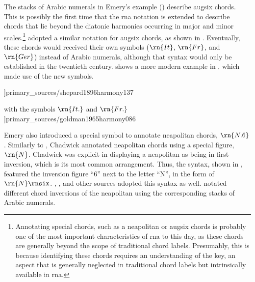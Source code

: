 


The stacks of Arabic numerals in Emery's example
() describe
\gls{augsix} chords. This is possibly the first time that
the \gls{rna} notation is extended to describe chords that
lie beyond the diatonic harmonies occurring in major and
minor scales.\footnote{Annotating special chords, such as a
\gls{neapolitan} or \gls{augsix} chords is probably one of
the most important characteristics of \gls{rna} to this day,
as these chords are generally beyond the scope of
traditional chord labels. Presumably, this is because
identifying these chords requires an understanding of the
key, an aspect that is generally neglected in traditional
chord labels but intrinsically available in \gls{rna}.}
\textcite{shepard1896harmony} adopted a similar notation for
\gls{augsix} chords, as shown in
. Eventually,
these chords would received their own symbols ($\rn{It}$,
$\rn{Fr}$, and $\rn{Ger}$) instead of Arabic numerals,
although that syntax would only be established in the
twentieth century.
 shows a more
modern example in \textcite{goldman1965harmony}, which made
use of the new symbols.

\phdfigure[Augmented sixth chords in
\textcite[p.~137]{shepard1896harmony}]{primary_sources/shepard1896harmony137}

\phdfigure[Augmented sixth chords in
\textcite[p.~86]{goldman1965harmony} with the symbols
$\rn{It.}$ and
$\rn{Fr.}$]{primary_sources/goldman1965harmony086}

Emery also introduced a special symbol to annotate
\gls{neapolitan} chords, $\rn{N.6}$. Similarly to
\textcite{emery1879elements}, Chadwick annotated
\gls{neapolitan} chords using a special figure, $\rn{N}$.
Chadwick was explicit in displaying a \gls{neapolitan} as
being in first inversion, which is its most common
arrangement. Thus, the syntax, shown in
, featured
the inversion figure ``6'' next to the letter ``N'', in the
form of $\rn{N}\rnsix$. \textcite{heacox1907lessons},
\textcite{alchin1921applied}, and other sources adopted this
syntax as well. \textcite{heacox1907lessons} notated
different chord inversions of the \gls{neapolitan} using the
corresponding stacks of Arabic numerals.

